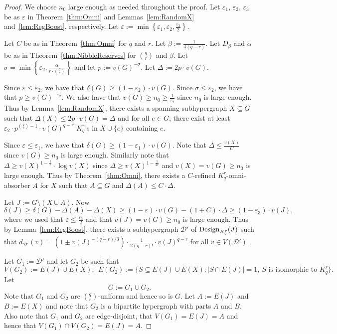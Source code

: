 \documentclass[11pt]{article}
\newcounter{i}
\theoremstyle{plain}
\theoremstyle{plain} %
\theoremstyle{definition}
\begin{document}
\begin{proof}
We choose $n_0$ large enough as needed throughout the proof. Let $\varepsilon_1$, $\varepsilon_2$, $\varepsilon_3$ be as $\varepsilon$ in Theorem~\ref{thm:Omni} and Lemmas~\ref{lem:RandomX} and~\ref{lem:RegBoost}, respectively. Let $\varepsilon := \min \left\{\varepsilon_1,\varepsilon_2,\frac{\varepsilon_3}{2}\right\}$.

Let $C$ be as in Theorem~\ref{thm:Omni} for $q$ and $r$. Let $\beta:=\frac{1}{4(q-r)}$. Let $D_{\beta}$ and $\alpha$ be as in Theorem~\ref{thm:NibbleReserves} for $\binom{q}{r}$ and $\beta$. Let $\sigma = \min\left\{ \varepsilon_2, \frac{\alpha}{r\cdot \binom{q}{r}}\right\}$ and let $p:=v(G)^{-\sigma}$. Let $\Delta:= 2p\cdot v(G)$. 

Since $\varepsilon\le \varepsilon_2$, we have that $\delta(G)\ge (1-\varepsilon_2)\cdot v(G)$. Since $\sigma \le \varepsilon_2$, we have that $p\ge v(G)^{-\varepsilon_2}$. We also have that $v(G)\ge n_0\ge \frac{1}{\varepsilon_2}$ since $n_0$ is large enough. Thus by Lemma~\ref{lem:RandomX}, there exists a spanning subhypergraph  $X\subseteq G$ such that $\Delta(X)\le 2p\cdot v(G) = \Delta$ and for all $e\in G$, there exist at least $\varepsilon_2 \cdot p^{\binom{q}{r}-1}\cdot v(G)^{q-r}$ $K_q^r$'s in $X\cup \{e\}$ containing $e$.

Since $\varepsilon\le \varepsilon_1$, we have that $\delta(G) \ge (1-\varepsilon_1)\cdot v(G)$. Note that $\Delta \le \frac{v(X)}{C}$ since $v(G)\ge n_0$ is large enough. Similarly note that $\Delta \ge v(X)^{1-\frac{1}{r}}\cdot \log v(X)$ since $\Delta \ge v(X)^{1-\frac{1}{2r}}$ and $v(X)=v(G)\ge n_0$ is large enough. Thus by Theorem~\ref{thm:Omni}, there exists a $C$-refined $K_q^r$-omni-absorber $A$ for $X$ such that $A\subseteq G$ and $\Delta(A)\le C \cdot \Delta$.

Let $J:= G\setminus (X\cup A)$. Now $$\delta(J) \ge \delta(G) - \Delta(A) - \Delta(X) \ge (1-\varepsilon)\cdot v(G) - (1+C)\cdot \Delta \ge (1-\varepsilon_3)\cdot v(J),$$
where we used that $\varepsilon\le \frac{\varepsilon_3}{2}$ and that $v(J)=v(G)\ge n_0$ is large enough. Thus by Lemma~\ref{lem:RegBoost}, there exists a subhypergraph $\mathcal{D}'$ of ${\rm Design}_{K_q^r}(J)$ such that $d_{\mathcal{D}'}(v) = (1 \pm v(J)^{-(q-r)/3}) \cdot \frac{1}{2(q-r)!} \cdot v(J)^{q-r}$ for all $v\in V(\mathcal{D}')$.

Let $G_1:= \mathcal{D}'$ and let $G_2$ be such that 
$$V(G_2) := E(J)\cup E(X),~~E(G_2) := \{ S\subseteq E(J)\cup E(X): |S\cap E(J)|=1,~ S \text{ is isomorphic to } K_q^r\}.$$ Let $$G:= G_1\cup G_2.$$ 
Note that $G_1$ and $G_2$ are $\binom{q}{r}$-uniform and hence so is $G$. Let $A:=E(J)$ and $B:=E(X)$ and note that $G_2$ is a bipartite hypergraph with parts $A$ and $B$.
Also note that $G_1$ and $G_2$ are edge-disjoint, that $V(G_1)=E(J)=A$ and hence that $V(G_1)\cap V(G_2)=E(J)=A$. 


\end{proof}
\end{document}
